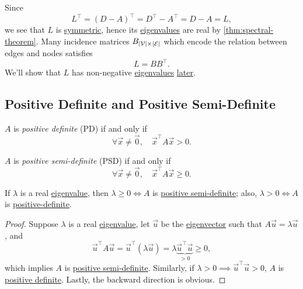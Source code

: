 \begin{remark}
	Since
	\[
		L^{\top} = (D - A)^{\top} = D^{\top} - A^{\top} = D - A = L,
	\]
	we see that \(L\) is \hyperref[def:symmetric-matrix]{symmetric}, hence its \hyperref[def:eigenvalue]{eigenvalues} are real by \autoref{thm:spectral-theorem}.
	Many incidence matrices \(B_{\left\vert \mathcal{\MakeUppercase{v}} \right\vert \times \left\vert \mathcal{\MakeUppercase{e}} \right\vert }\) which encode the
	relation between edges and nodes satisfies
	\[
		L = BB^{\top}.
	\]
	We'll show that \(L\) has non-negative \hyperref[def:eigenvalue]{eigenvalues} \hyperref[rmk:property-of-Laplacian]{later}.
\end{remark}
\subsection{Positive Definite and Positive Semi-Definite}
\begin{definition}\label{def:positive-definite}
	\(A \) is \emph{positive definite} (PD) if and only if
	\[
		\forall \vec{x} \neq  \vec{0},\quad \vec{x}^{\top}A \vec{x} > 0.
	\]
\end{definition}

\begin{definition}\label{def:positive-semi-definite}
	\(A \) is \emph{positive semi-definite} (PSD) if and only if
	\[
		\forall \vec{x} \neq  \vec{0},\quad \vec{x}^{\top}A \vec{x} \geq  0.
	\]
\end{definition}

\begin{lemma}\label{lma:lec8-1}
	If \(\lambda\) is a real \hyperref[def:eigenvalue]{eigenvalue}, then \(\lambda \geq  0 \iff A\) is \hyperref[def:positive-semi-definite]{positive semi-definite};
	also, \(\lambda > 0 \iff A\) is \hyperref[def:positive-definite]{positive-definite}.
\end{lemma}
\begin{proof}
	Suppose \(\lambda\) is a real \hyperref[def:eigenvalue]{eigenvalue}, let \(\vec{u}\) be the \hyperref[def:eigenvector]{eigenvector} such that \(A \vec{u} = \lambda \vec{u}\), and
	\[
		\vec{u}^{\top} A \vec{u} = \vec{u}^{\top} (\lambda \vec{u}) = \lambda \underbrace{\vec{u}^{\top}\vec{u}}_{>0} \geq 0,
	\]
	which implies \(A\) is \hyperref[def:positive-semi-definite]{positive semi-definite}. Similarly, if \(\lambda > 0 \implies \vec{u}^{\top} \vec{u} > 0\),
	\(A\) is \hyperref[def:positive-definite]{positive definite}. Lastly, the backward direction is obvious.
\end{proof}


